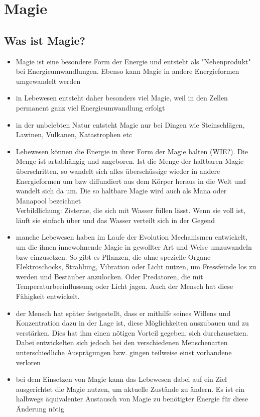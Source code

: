 \section{Magie}
\subsection{Was ist Magie?}
\begin{itemize}
	\item Magie ist eine besondere Form der Energie und entsteht als "Nebenprodukt" bei Energieumwandlungen. Ebenso kann Magie in andere Energieformen umgewandelt werden
	\item in Lebewesen entsteht daher besonders viel Magie, weil in den Zellen permanent ganz viel Energieumwandlung erfolgt
	\item in der unbelebten Natur entsteht Magie nur bei Dingen wie Steinschlägen, Lawinen, Vulkanen, Katastrophen etc
	\item Lebewesen können die Energie in ihrer Form der Magie halten (WIE?). Die Menge ist artabhängig und angeboren. Ist die Menge der haltbaren Magie überschritten, so wandelt sich alles überschüssige wieder in andere Energieformen um bzw diffundiert aus dem Körper heraus in die Welt und wandelt sich da um. Die so haltbare Magie wird auch als Mana oder Manapool bezeichnet \\
	Verbildlichung:  Zisterne, die sich mit Wasser füllen lässt. Wenn sie voll ist, läuft sie einfach über und das Wasser verteilt sich in der Gegend
	\item manche Lebewesen haben im Laufe der Evolution Mechanismen entwickelt, um die ihnen innewohnende Magie in gewollter Art und Weise umzuwandeln bzw einzusetzen. So gibt es Pflanzen, die ohne spezielle Organe Elektroschocks, Strahlung, Vibration oder Licht nutzen, um Fressfeinde los zu werden und Bestäuber anzulocken. Oder Predatoren, die mit Temperaturbeeinflussung oder Licht jagen. Auch der Mensch hat diese Fähigkeit entwickelt.
	\item der Mensch hat später festgestellt, dass er mithilfe seines Willens und Konzentration dazu in der Lage ist, diese Möglichkeiten auszubauen und zu verstärken. Dies hat ihm einen nötigen Vorteil gegeben, sich durchzusetzen. Dabei entwickelten sich jedoch bei den verschiedenen Menschenarten unterschiedliche Ausprägungen bzw. gingen teilweise einst vorhandene verloren
	\item bei dem Einsetzen von Magie kann das Lebewesen dabei auf ein Ziel ausgerichtet die Magie nutzen, um aktuelle Zustände zu ändern. Es ist ein halbwegs äquivalenter Austausch von Magie zu benötigter Energie für diese Änderung nötig

\end{itemize}

